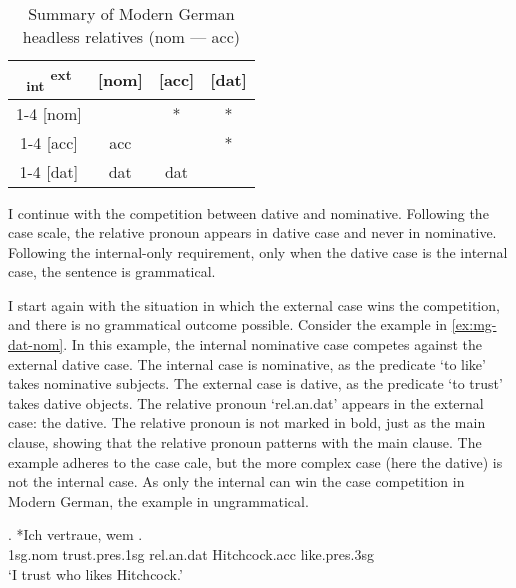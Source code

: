  \begin{table}[H]
   \center
   \caption{Summary of Modern German headless relatives (\ac{nom} --- \ac{acc})}
   \begin{tabular}{c|c|c|c}
     \toprule
     \textsubscript{\ac{int}} \textsuperscript{\ac{ext}}
            & [\ac{nom}]
            & [\ac{acc}]
            & [\ac{dat}]
            \\ \cmidrule{1-4}
        [\ac{nom}]
            & \xcancel{\phantom{xx}}
            & \cellcolor{LG}*
            & *
            \\ \cmidrule{1-4}
        [\ac{acc}]
            & \cellcolor{DG}\ac{acc}
            & \xcancel{\phantom{xx}}
            & *
            \\ \cmidrule{1-4}
        [\ac{dat}]
            & \ac{dat}
            & \ac{dat}
            & \xcancel{\phantom{xx}}
            \\
      \bottomrule
   \end{tabular}
     \label{tbl:case-competition-mg-nom-acc}
 \end{table}

I continue with the competition between dative and nominative. Following the case scale, the relative pronoun appears in dative case and never in nominative. Following the internal-only requirement, only when the dative case is the internal case, the sentence is grammatical.

I start again with the situation in which the external case wins the competition, and there is no grammatical outcome possible.
Consider the example in \ref{ex:mg-dat-nom}. In this example, the internal nominative case competes against the external dative case.
The internal case is nominative, as the predicate  `to like' takes nominative subjects.
The external case is dative, as the predicate  `to trust' takes dative objects.
The relative pronoun  `\ac{rel}.\ac{an}.\ac{dat}' appears in the external case: the dative. The relative pronoun is not marked in bold, just as the main clause, showing that the relative pronoun patterns with the main clause.
The example adheres to the case cale, but the more complex case (here the dative) is not the internal case. As only the internal can win the case competition in Modern German, the example in ungrammatical.

\exg. *Ich vertraue, wem  .\\
1\ac{sg}.\ac{nom} trust.\ac{pres}.1\ac{sg}\scsub{[dat]} \ac{rel}.\ac{an}.\ac{dat} Hitchcock.\ac{acc} like.\ac{pres}.3\ac{sg}\scsub{[nom]}\\
`I trust who likes Hitchcock.' \label{ex:mg-dat-nom}

